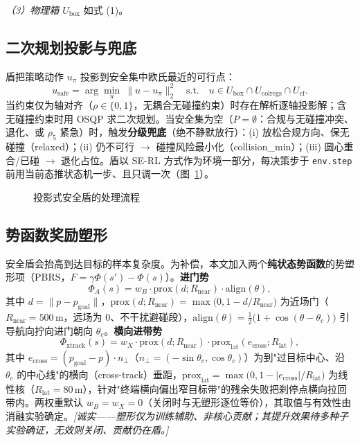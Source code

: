 \documentclass[12pt,letterpaper]{article}
\begin{document}
\textit{（3）物理箱 $U_{\text{box}}$} 如式 (1)。

\subsection{二次规划投影与兜底}
盾把策略动作 $u_\pi$ 投影到安全集中欧氏最近的可行点：
\begin{equation}
u_{\text{safe}}=\arg\min_{u}\ \|u-u_\pi\|_2^2\quad\text{s.t.}\quad u\in U_{\text{box}}\cap U_{\text{colregs}}\cap U_{\text{cf}}.
\end{equation}
当约束仅为轴对齐（$\rho\in\{0,1\}$，无耦合无碰撞约束）时存在解析逐轴投影解；含无碰撞约束时用 OSQP 求二次规划。当安全集为空（$P=\emptyset$：合规与无碰撞冲突、退化、或 $\rho_5$ 紧急）时，触发\textbf{分级兜底}（绝不静默放行）：(i) 放松合规方向、保无碰撞（relaxed）；(ii) 仍不可行 $\to$ 碰撞风险最小化（collision\_min）；(iii) 圆心重合/已碰 $\to$ 退化占位。盾以 SE-RL 方式作为环境一部分，每决策步于 \texttt{env.step} 前用当前态推状态机一步、且只调一次（图~\ref{fig:shield}）。

\begin{figure}[h]
  \centering
  \caption{投影式安全盾的处理流程}
  \label{fig:shield}
\end{figure}

\subsection{势函数奖励塑形}
安全盾会抬高到达目标的样本复杂度。为补偿，本文加入两个\textbf{纯状态势函数}的势塑形项（PBRS，$F=\gamma\Phi(s')-\Phi(s)$）。\textbf{进门势}
\begin{equation}\label{eq:phiA}
\Phi_A(s)=w_B\cdot\mathrm{prox}(d;R_{\text{near}})\cdot\mathrm{align}(\theta),
\end{equation}
其中 $d=\|p-p_{\text{goal}}\|$，$\mathrm{prox}(d;R_{\text{near}})=\max\!\big(0,1-d/R_{\text{near}}\big)$ 为近场门（$R_{\text{near}}=500$\,m，远场为 0、不干扰避碰段），$\mathrm{align}(\theta)=\tfrac12\big(1+\cos(\theta-\theta_c)\big)$ 引导航向拧向进门朝向 $\theta_c$。\textbf{横向进带势}
\begin{equation}\label{eq:phix}
\Phi_{\text{xtrack}}(s)=w_X\cdot\mathrm{prox}(d;R_{\text{near}})\cdot\mathrm{prox}_{\text{lat}}(e_{\text{cross}};R_{\text{lat}}),
\end{equation}
其中 $e_{\text{cross}}=(p_{\text{goal}}-p)\cdot n_\perp$（$n_\perp=(-\sin\theta_c,\cos\theta_c)$）为到"过目标中心、沿 $\theta_c$ 的中心线"的横向（cross-track）垂距，$\mathrm{prox}_{\text{lat}}=\max\!\big(0,1-|e_{\text{cross}}|/R_{\text{lat}}\big)$ 为线性核（$R_{\text{lat}}=80$\,m），针对"终端横向偏出窄目标带"的残余失败把刹停点横向拉回带内。两权重默认 $w_B=w_X=0$（关闭时与无塑形逐位等价），其取值与有效性由消融实验确定。\textit{[诚实——塑形仅为训练辅助、非核心贡献；其提升效果待多种子实验确证，无效则关闭、贡献仍在盾。]}
\end{document}
